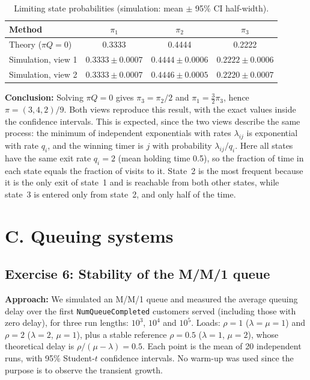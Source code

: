 ﻿\documentclass[12pt]{article}
\begin{document}
\begin{table}[H]
    \centering
    \caption{Limiting state probabilities (simulation: mean $\pm$ 95\% CI half-width).}
    \label{tab:ctmc-limiting}
    \begin{tabular}{l|ccc}
        Method & $\pi_1$ & $\pi_2$ & $\pi_3$ \\
        \hline
        Theory ($\pi Q=0$) & 0.3333 & 0.4444 & 0.2222 \\
        Simulation, view 1 & $0.3333\pm0.0007$ & $0.4444\pm0.0006$ & $0.2222\pm0.0006$ \\
        Simulation, view 2 & $0.3333\pm0.0007$ & $0.4446\pm0.0005$ & $0.2220\pm0.0007$ \\
    \end{tabular}
\end{table}

\textbf{Conclusion:} Solving $\pi Q=0$ gives $\pi_3=\pi_2/2$ and
$\pi_1=\tfrac32\pi_3$, hence $\pi=(3,4,2)/9$. Both views reproduce this result,
with the exact values inside the confidence intervals. This is expected, since
the two views describe the same process: the minimum of independent
exponentials with rates $\lambda_{ij}$ is exponential with rate $q_i$, and
the winning timer is $j$ with probability $\lambda_{ij}/q_i$. Here all states
have the same exit rate $q_i=2$ (mean holding time 0.5), so the fraction of time
in each state equals the fraction of visits to it. State~2 is the most
frequent because it is the only exit of state~1 and is reachable from both
other states, while state~3 is entered only from state~2, and only half of the
time.

\section{C. Queuing systems}\label{sec:C}

\subsection{Exercise 6: Stability of the M/M/1 queue}

\textbf{Approach:} We simulated an M/M/1 queue and measured the average queuing
delay over the first \texttt{NumQueueCompleted} customers served
(including those with zero delay), for three run lengths: $10^3$, $10^4$
and $10^5$. Loads: $\rho=1$ ($\lambda=\mu=1$) and $\rho=2$ ($\lambda=2$, $\mu=1$),
plus a stable reference $\rho=0.5$ ($\lambda=1$, $\mu=2$), whose theoretical delay is
$\rho/(\mu-\lambda)=0.5$. Each point is the mean of 20 independent runs, with 95\%
Student-$t$ confidence intervals. No warm-up was used since the purpose
is to observe the transient growth.
\end{document}
